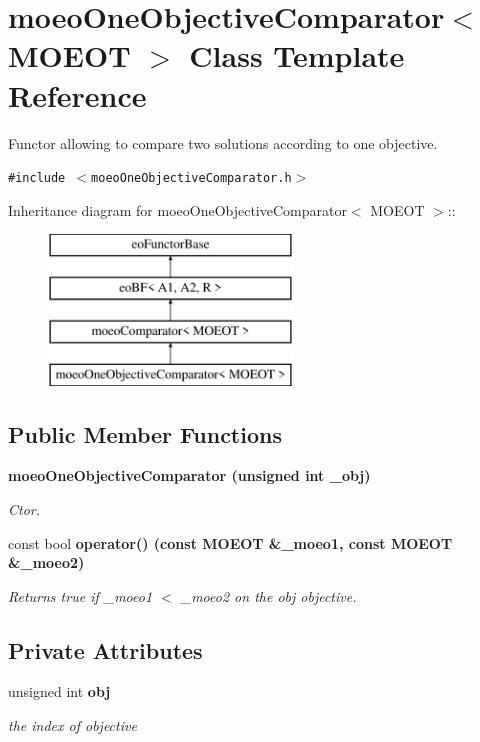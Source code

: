 \section{moeo\-One\-Objective\-Comparator$<$ MOEOT $>$ Class Template Reference}
\label{classmoeoOneObjectiveComparator}
Functor allowing to compare two solutions according to one objective.  


{\tt \#include $<$moeo\-One\-Objective\-Comparator.h$>$}

Inheritance diagram for moeo\-One\-Objective\-Comparator$<$ MOEOT $>$::\begin{figure}[H]
\begin{center}
\leavevmode
\includegraphics[height=4cm]{classmoeoOneObjectiveComparator}
\end{center}
\end{figure}
\subsection*{Public Member Functions}
\begin{CompactItemize}
\item 
\bf{moeo\-One\-Objective\-Comparator} (unsigned int \_\-obj)
\begin{CompactList}\small\item\em Ctor. \item\end{CompactList}\item 
const bool \bf{operator()} (const MOEOT \&\_\-moeo1, const MOEOT \&\_\-moeo2)
\begin{CompactList}\small\item\em Returns true if \_\-moeo1 $<$ \_\-moeo2 on the obj objective. \item\end{CompactList}\end{CompactItemize}
\subsection*{Private Attributes}
\begin{CompactItemize}
\item 
unsigned int \bf{obj}\label{classmoeoOneObjectiveComparator_a45047e66adac81f5a34a2a0fe05f591}

\begin{CompactList}\small\item\em the index of objective \item\end{CompactList}\end{CompactItemize}


